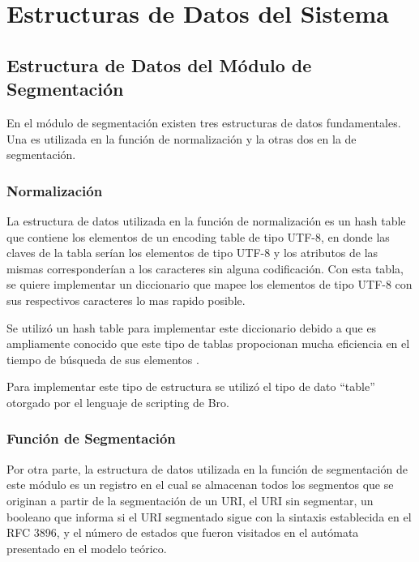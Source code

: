 \chapter{Estructuras de Datos del Sistema}
\label{apendiceA}



\section*{Estructura de Datos del Módulo de Segmentación}

En el módulo de segmentación existen tres estructuras de datos fundamentales. Una es utilizada en la función de normalización y la otras dos en
la de segmentación.

\subsection*{Normalización}
\label{ssec:estructuraNormalizacion}

La estructura de datos utilizada en la función de normalización es un hash table que contiene los elementos de un encoding table de tipo UTF-8, en donde las claves de la tabla serían los elementos de tipo UTF-8 y los atributos de las mismas corresponderían a los caracteres sin alguna codificación. Con esta tabla, se quiere implementar un diccionario que mapee los elementos de tipo UTF-8 con sus respectivos caracteres lo mas rapido posible.

Se utilizó un hash table para implementar este diccionario debido a que es ampliamente conocido que este tipo de tablas propocionan mucha eficiencia en el tiempo de búsqueda de sus elementos \cite{Cormen}.

Para implementar este tipo de estructura se utilizó el tipo de dato ``table'' otorgado por el lenguaje de scripting de Bro.

\subsection*{Función de Segmentación}
\label{ssec:estructuraSegmentacion}

Por otra parte, la estructura de datos utilizada en la función de segmentación de este módulo es un registro en el cual se almacenan todos los segmentos que se originan a partir de la segmentación de un URI, el URI sin segmentar, un booleano que informa si el URI segmentado sigue con la sintaxis establecida en el RFC 3896, y el número de estados que fueron visitados en el autómata presentado en el modelo teórico.
 
